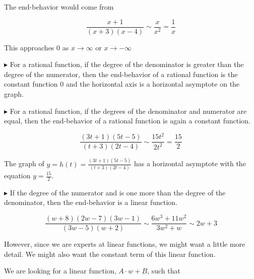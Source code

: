 \documentclass{ximera}
\begin{document}
The end-behavior would come from 


\[ \frac{x+1}{(x+3)(x-4)}    \sim    \frac{x}{x^2} = \frac{1}{x}  \]


This approaches $0$ as $x \to \infty$ or $x \to -\infty$ 


$\blacktriangleright$   For a rational function, if the degree of the denominator is greater than the degree of the numerator, then the end-behavior of a rational function is the constant function $0$ and the horizontal axis is a horizontal asymptote on the graph.




$\blacktriangleright$   For a rational function, if the degrees of the denominator and numerator are equal, then the end-behavior of a rational function is again a constant function.


\[ \frac{(3t+1)(5t-5)}{(t+3)(2t-4)}    \sim    \frac{15t^2}{2t^2} = \frac{15}{2}  \]




The graph of $y = h(t) = \frac{(3t+1)(5t-5)}{(t+3)(2t-4)} $ has a horizontal asymptote with the equation $y = \frac{15}{2}$.




$\blacktriangleright$   If the degree of the numerator and is one more than the degree of the denominator, then the end-behavior is a linear function.


\[ \frac{(w+8)(2w-7)(3w-1)}{(3w-5)(w+2)}    \sim   \frac{6w^3 + 11w^2}{3w^2 + w} \sim 2w +3 \]
















\begin{center}
\end{center}







\begin{center}
\end{center}



However, since we are experts at linear functions, we might want a little more detail.  We might also want the constant term of this linear function.  

We are looking for a linear function, $A \cdot w + B$, such that 
\end{document}
